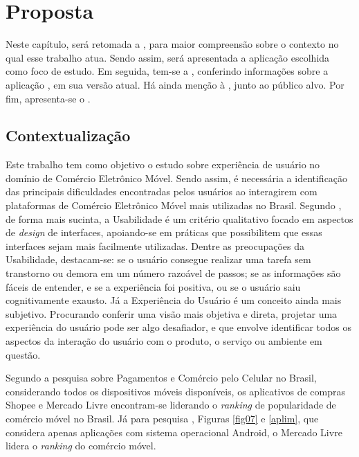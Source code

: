 \chapter{Proposta}
    \label{chap:Proposta}

Neste capítulo, será retomada a , para maior compreensão sobre o contexto no qual esse trabalho atua. Sendo assim, será apresentada a aplicação escolhida como foco de estudo. Em seguida, tem-se a , conferindo informações sobre a aplicação , em sua versão atual. Há ainda menção à , junto ao público alvo. Por fim, apresenta-se o .


\section{Contextualização} 
    \label{ContextualizaçãoProsposta}

Este trabalho tem como objetivo o estudo sobre experiência de usuário no domínio de Comércio Eletrônico Móvel. Sendo assim, é necessária a identificação das principais dificuldades encontradas pelos usuários ao interagirem com plataformas de Comércio Eletrônico Móvel mais utilizadas no Brasil. Segundo , de forma mais sucinta, a Usabilidade é um critério qualitativo focado em aspectos de \textit{design} de interfaces, apoiando-se em práticas que possibilitem que essas interfaces sejam mais facilmente utilizadas. Dentre as preocupações da Usabilidade, destacam-se: se o usuário consegue realizar uma tarefa sem transtorno ou demora em um número razoável de passos; se as informações são fáceis de entender, e se a experiência foi positiva, ou se o usuário saiu cognitivamente exausto. Já a Experiência do Usuário é um conceito ainda mais subjetivo. Procurando conferir uma visão mais objetiva e direta, projetar uma experiência do usuário pode ser algo desafiador, e que envolve identificar todos os aspectos da interação do usuário com o produto, o serviço ou ambiente em questão.

Segundo a pesquisa  sobre Pagamentos e Comércio pelo Celular no Brasil, considerando todos os dispositivos móveis disponíveis, os aplicativos de compras Shopee e Mercado Livre encontram-se liderando o \textit{ranking} de popularidade de comércio móvel no Brasil. Já para pesquisa , Figuras \ref{fig07} e \ref{aplim}, que considera apenas aplicações com sistema operacional Android, o Mercado Livre lidera o \textit{ranking} do comércio móvel.

